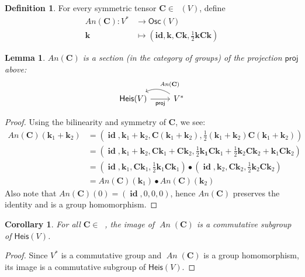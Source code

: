 \documentclass[12pt]{article}
\newcounter{counter}
\theoremstyle{definition}
\newtheorem{dfn}[counter]{Definition}
\theoremstyle{plain}
\newtheorem{lem}[counter]{Lemma}
\newtheorem{cor}[counter]{Corollary}
\newcommand{\Sym}{\mathop{\mathrm{Sym}_2}}
\newcommand{\id}{\mathop{\mathbf{id}}\nolimits}
\newcommand{\An}{\mathop{\mathit{An}}}
\begin{document}
\begin{dfn}
    For every symmetric tensor \(\mathbf{C} \in \Sym (V)\), define
    \begin{align}
        \mathit{An}(\mathbf{C}) \colon V^* &\to \mathsf{Osc} (V) \\
        \mathbf{k} &\mapsto \left(\mathbf{id},  \mathbf{k}, \mathbf{Ck}, \tfrac{1}{2} \mathbf{kCk} \right)
    \end{align}
\end{dfn}

\begin{lem}
$An(\mathbf{C})$ is a section (in the category of groups) of the projection $\mathsf{proj}$ above:
\begin{equation}
\begin{tikzcd}
    \mathsf{Heis}(V) \ar[r, "\mathsf{proj}"'] & V^* \ar[l, bend right, "An(\mathbf{C})"']
\end{tikzcd}
\end{equation}
\end{lem}

\begin{proof}
Using the bilinearity and symmetry of $\mathbf{C}$, we see:
\begin{align}
An(\mathbf{C})(\mathbf{k}_1+\mathbf{k}_2) &= (\id, \mathbf{k}_1+\mathbf{k}_2,\mathbf{C}(\mathbf{k}_1+\mathbf{k}_2),\frac{1}{2}(\mathbf{k}_1+\mathbf{k}_2)\mathbf{C}(\mathbf{k}_1+\mathbf{k}_2))\\
&=(\id ,\mathbf{k}_1+\mathbf{k}_2,\mathbf{Ck}_1+\mathbf{Ck}_2,\frac{1}{2}\mathbf{k_1}\mathbf{Ck}_1+\frac{1}{2}\mathbf{k}_2\mathbf{Ck}_2+\mathbf{k}_1\mathbf{Ck}_2)\\
&=(\id,\mathbf{k}_1,\mathbf{Ck}_1,\frac{1}{2}\mathbf{k}_1\mathbf{Ck}_1)\bullet(\id,\mathbf{k}_2,\mathbf{Ck}_2,\frac{1}{2}\mathbf{k}_2\mathbf{Ck}_2)\\
&= An(\mathbf{C})(\mathbf{k}_1)\bullet An(\mathbf{C})(\mathbf{k}_2)
\end{align}
Also note that $An(\mathbf{C})(0) = (\id,0,0,0)$, hence $An(\mathbf{C})$ preserves the identity and is a group homomorphism.
\end{proof}

\begin{cor}
    For all \(\mathbf{C} \in \Sym\), the image of \(\An(\mathbf{C})\) is a commutative subgroup of \(\mathsf{Heis}(V)\).
\end{cor}

\begin{proof}
    Since $V^*$ is a commutative group and \(\An (\mathbf{C})\) is a group homomorphism, its image is a commutative subgroup of \(\mathsf{Heis}(V)\).
\end{proof}
\end{document}
